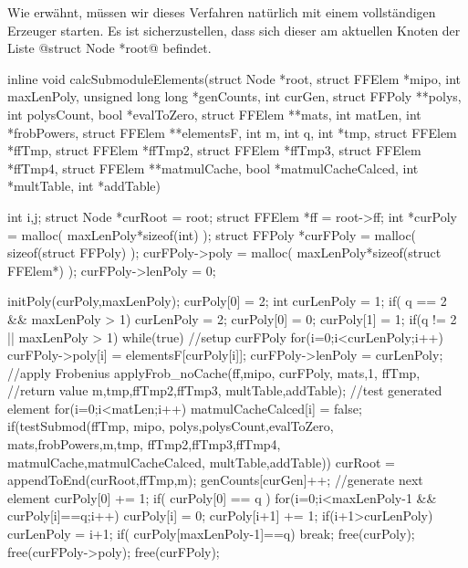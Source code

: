 Wie erwähnt, müssen wir dieses Verfahren natürlich mit einem vollständigen
Erzeuger starten. Es ist sicherzustellen, dass sich dieser am aktuellen Knoten 
der Liste @struct Node *root@ befindet.

\begin{ccode}[caption={[\texttt{void calcSubmoduleElements} aus 
 \url{../Sage/enumeratePCNs.c}]Aus \url{../Sage/enumeratePCNs.c}},
  label=lst:calcSubmoduleElements]
inline void calcSubmoduleElements(struct Node *root,
        struct FFElem *mipo,
        int maxLenPoly, 
        unsigned long long *genCounts, int curGen,
        struct FFPoly **polys, int polysCount, bool *evalToZero,
        struct FFElem **mats, int matLen, int *frobPowers,
        struct FFElem **elementsF,
        int m, int q, int *tmp,
        struct FFElem *ffTmp, struct FFElem *ffTmp2, struct FFElem *ffTmp3, 
        struct FFElem *ffTmp4,
        struct FFElem **matmulCache, bool *matmulCacheCalced,
        int *multTable, int *addTable){
    int i,j;
    struct Node *curRoot = root;
    struct FFElem *ff = root->ff;
    int *curPoly = malloc( maxLenPoly*sizeof(int) );
    struct FFPoly *curFPoly = malloc( sizeof(struct FFPoly) );
    curFPoly->poly = malloc( maxLenPoly*sizeof(struct FFElem*) );
    curFPoly->lenPoly = 0;
    
    initPoly(curPoly,maxLenPoly);
    curPoly[0] = 2;
    int curLenPoly = 1;
    if( q == 2 && maxLenPoly > 1){
        curLenPoly = 2;
        curPoly[0] = 0;
        curPoly[1] = 1;
    }
    if(q != 2 || maxLenPoly > 1){
        while(true){
            //setup curFPoly
            for(i=0;i<curLenPoly;i++)
                curFPoly->poly[i] = elementsF[curPoly[i]];
            curFPoly->lenPoly = curLenPoly;
            //apply Frobenius
            applyFrob_noCache(ff,mipo,
                    curFPoly,
                    mats,1, ffTmp, //return value
                    m,tmp,ffTmp2,ffTmp3,
                    multTable,addTable);
            //test generated element
            for(i=0;i<matLen;i++) matmulCacheCalced[i] = false;
            if(testSubmod(ffTmp, mipo,
                    polys,polysCount,evalToZero,
                    mats,frobPowers,m,tmp,
                    ffTmp2,ffTmp3,ffTmp4,
                    matmulCache,matmulCacheCalced, multTable,addTable)){
                curRoot = appendToEnd(curRoot,ffTmp,m);
                genCounts[curGen]++;
            }
            //generate next element
            curPoly[0] += 1;
            if( curPoly[0] == q ){
                for(i=0;i<maxLenPoly-1 && curPoly[i]==q;i++){
                    curPoly[i] = 0;
                    curPoly[i+1] += 1;
                }
                if(i+1>curLenPoly)
                    curLenPoly = i+1;
                if( curPoly[maxLenPoly-1]==q){
                    break;
                }
            }
        }
    }
    free(curPoly);
    free(curFPoly->poly);
    free(curFPoly);
}
\end{ccode}

